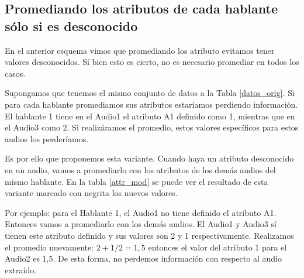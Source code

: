 \subsection{Promediando los atributos de cada hablante sólo si es desconocido}

En el anterior esquema vimos que promediando los atributo evitamos tener valores desconocidos. Sí bien esto es cierto, no es necesario promediar en todos los casos. 

Supongamos que tenemos el mismo conjunto de datos a la Tabla \ref{datos_orig}. Si para cada hablante promediamos sus atributos estaríamos perdiendo información. El hablante 1 tiene en el Audio1 el atributo A1 definido como 1, mientras que en el Audio3 como 2. Si realizáramos el promedio, estos valores específicos para estos audios los perderíamos.


Es por ello que proponemos esta variante. Cuando haya un atributo desconocido en un audio, vamos a promediarlo con los atributos de los demás audios del mismo hablante. En la tabla \ref{attr_mod} se puede ver el resultado de esta variante marcado con negrita los nuevos valores. 

Por ejemplo: para el Hablante 1, el Audio1 no tiene definido el atributo A1. Entonces vamos a promediarlo con los demás audios. El Audio1 y Audio3 sí tienen este atributo definido y sus valores son 2 y 1 respectivamente. Realizamos el promedio nuevamente: $ 2 + 1 / 2 = 1,5$ entonces el valor del atributo 1 para el Audio2 es 1,5. De esta forma, no perdemos información con respecto al audio extraído.

